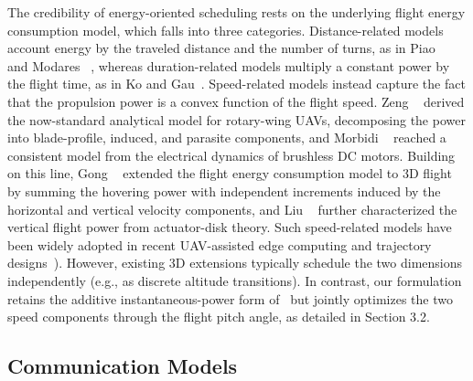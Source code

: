 The credibility of energy-oriented scheduling rests on the underlying flight energy consumption model, which falls into three categories.
Distance-related models account energy by the traveled distance and the number of turns, as in Piao \etal~\cite{Automating} and Modares \etal~\cite{UB-ANC-planner}, whereas duration-related models multiply a constant power by the flight time, as in Ko and Gau~\cite{UAV-Velocity-Function-Design}.
Speed-related models instead capture the fact that the propulsion power is a convex function of the flight speed.
Zeng \etal~\cite{Rotary-Wing-UAV} derived the now-standard analytical model for rotary-wing UAVs, decomposing the power into blade-profile, induced, and parasite components, and Morbidi \etal~\cite{Minimum-energy-path-generation} reached a consistent model from the electrical dynamics of brushless DC motors.
Building on this line, Gong \etal~\cite{GongHao} extended the flight energy consumption model to 3D flight by summing the hovering power with independent increments induced by the horizontal and vertical velocity components, and Liu \etal~\cite{PowerConsumptionModel} further characterized the vertical flight power from actuator-disk theory.
Such speed-related models have been widely adopted in recent UAV-assisted edge computing and trajectory designs~\cite{Safe-and-Energy-Efficient-Trajectory, Energy-Efficient-UAV-Assisted-MEC}).
However, existing 3D extensions typically schedule the two dimensions independently (e.g., as discrete altitude transitions). In contrast, our formulation retains the additive instantaneous-power form of~\cite{GongHao, PowerConsumptionModel} but jointly optimizes the two speed components through the flight pitch angle, as detailed in Section 3.2.

\subsection{Communication Models}

